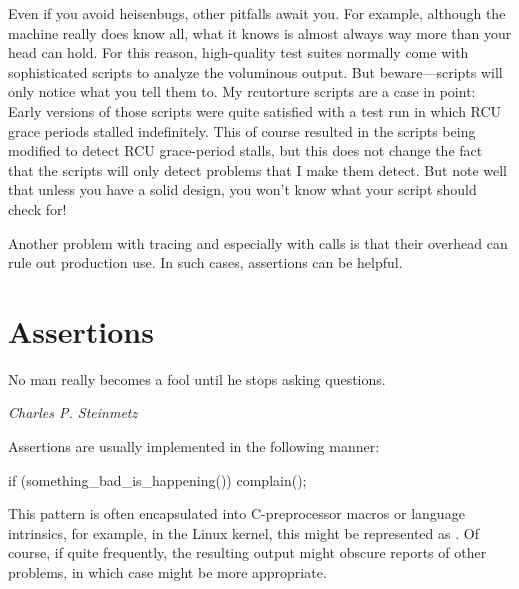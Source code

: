Even if you avoid heisenbugs, other pitfalls await you.
For example, although the machine really does know all,
what it knows is almost always way more than your head can hold.
For this reason, high-quality test suites normally come with sophisticated
scripts to analyze the voluminous output.
But beware---scripts will only notice what you tell them to.
My rcutorture scripts are a case in point: Early versions of those
scripts were quite satisfied with a test run in which RCU grace periods
stalled indefinitely.
This of course resulted in the scripts being modified to detect RCU
grace-period stalls, but this does not change the fact that the scripts
will only detect problems that I make them detect.
But note well that unless you have a solid design, you won't know what
your script should check for!

Another problem with tracing and especially with  calls
is that their overhead can rule out production use.
In such cases, assertions can be helpful.

\section{Assertions}
\label{sec:debugging:Assertions}
%
\epigraph{No man really becomes a fool until he stops asking questions.}
	 {\emph{Charles P. Steinmetz}}

Assertions are usually implemented in the following manner:

\begin{VerbatimN}
if (something_bad_is_happening())
	complain();
\end{VerbatimN}

This pattern is often encapsulated into C-preprocessor macros or
language intrinsics, for example, in the Linux kernel, this might
be represented as .
Of course, if  quite frequently,
the resulting output might obscure reports of other problems,
in which case
 might be more appropriate.

\QuickQuizEnd

